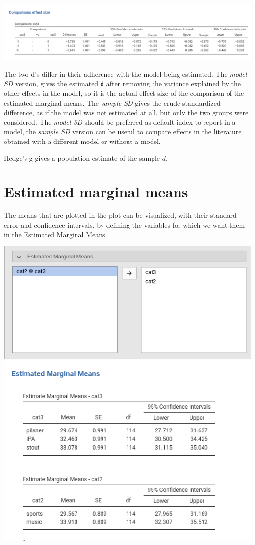 \documentclass[
]{book}
\begin{document}
\includegraphics{bookletpics/2_anova_output8.png}

The two d's differ in their adherence with the model being estimated. The \emph{model SD} version, gives the estimated \texttt{d} after removing the variance explained by the other effects in the model, so it is the actual effect size of the comparison of the estimated marginal means. The \emph{sample SD} gives the crude standardized difference, as if the model was not estimated at all, but only the two groups were considered. The \emph{model SD} should be preferred as default index to report in a model, the \emph{sample SD} version can be useful to compare effects in the literature obtained with a different model or without a model.

Hedge's g gives a population estimate of the sample \(d\).

\hypertarget{estimated-marginal-means}{%
\section{Estimated marginal means}\label{estimated-marginal-means}}

The means that are plotted in the plot can be visualized, with their standard error and confidence intervals, by defining the variables for which we want them in the {Estimated Marginal Means}.

\includegraphics{bookletpics/2_anova_input7.png}
\includegraphics{bookletpics/2_anova_output7.png}
\end{document}

